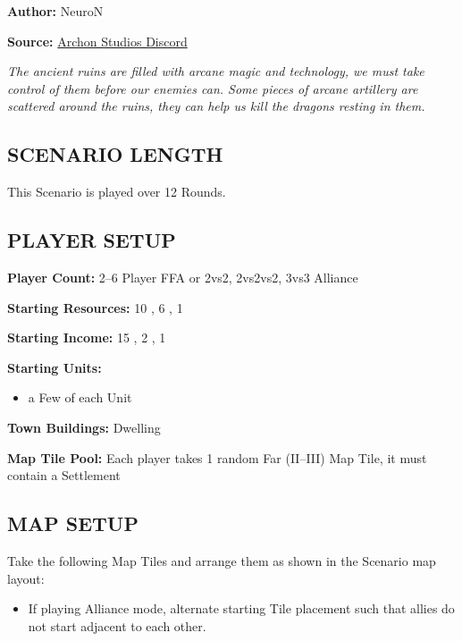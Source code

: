 
\begin{multicols}{2}

\textbf{Author:} NeuroN

\textbf{Source:} \href{https://discord.com/channels/740870068178649108/1279029213839626313}{Archon Studios Discord}

\textit{The ancient ruins are filled with arcane magic and technology, we must take control of them before our enemies can.
Some pieces of arcane artillery are scattered around the ruins, they can help us kill the dragons resting in them.}

\subsection*{\MakeUppercase{Scenario Length}}
This Scenario is played over 12 Rounds.

\subsection*{\MakeUppercase{Player Setup}}
\textbf{Player Count:} 2--6 Player FFA or 2vs2, 2vs2vs2, 3vs3 Alliance

\textbf{Starting Resources:} 10 , 6 , 1 

\textbf{Starting Income:} 15 , 2 , 1 

\textbf{Starting Units:}
\begin{itemize}
  \item a Few of each  Unit
\end{itemize}

\textbf{Town Buildings:}  Dwelling

\textbf{Map Tile Pool:} Each player takes 1 random Far (II--III) Map Tile, it must contain a Settlement

\subsection*{\MakeUppercase{Map Setup}}
Take the following Map Tiles and arrange them as shown in the Scenario map layout:

\begin{itemize}
  \item If playing Alliance mode, alternate starting Tile placement such that allies do not start adjacent to each other.
\end{itemize}


\end{multicols}
